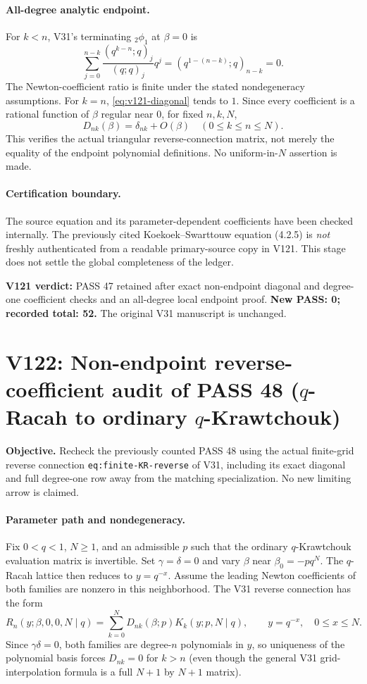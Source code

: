 \documentclass[11pt]{article}
\begin{document}
\paragraph{All-degree analytic endpoint.} For $k<n$, V31's terminating ${}_2\phi_1$ at $\beta=0$ is
\[
 \sum_{j=0}^{n-k}\frac{(q^{k-n};q)_j}{(q;q)_j}q^j
 =(q^{1-(n-k)};q)_{n-k}=0.
\]
The Newton-coefficient ratio is finite under the stated nondegeneracy assumptions. For $k=n$, \eqref{eq:v121-diagonal} tends to $1$. Since every coefficient is a rational function of $\beta$ regular near $0$, for fixed $n,k,N$,
\begin{equation}\label{eq:v121-endpoint}
\boxed{D_{nk}(\beta)=\delta_{nk}+O(\beta)\quad(0\le k\le n\le N).}
\end{equation}
This verifies the actual triangular reverse-connection matrix, not merely the equality of the endpoint polynomial definitions. No uniform-in-$N$ assertion is made.

\paragraph{Certification boundary.} The source equation and its parameter-dependent coefficients have been checked internally. The previously cited Koekoek--Swarttouw equation (4.2.5) is \emph{not} freshly authenticated from a readable primary-source copy in V121. This stage does not settle the global completeness of the ledger.

\noindent\textbf{V121 verdict:} PASS 47 retained after exact non-endpoint diagonal and degree-one coefficient checks and an all-degree local endpoint proof. \textbf{New PASS: 0; recorded total: 52.} The original V31 manuscript is unchanged.



\clearpage
\section{V122: Non-endpoint reverse-coefficient audit of PASS 48 ($q$-Racah to ordinary $q$-Krawtchouk)}
\noindent\textbf{Objective.} Recheck the previously counted PASS 48 using the actual finite-grid reverse connection \texttt{eq:finite-KR-reverse} of V31, including its exact diagonal and full degree-one row away from the matching specialization. No new limiting arrow is claimed.

\paragraph{Parameter path and nondegeneracy.} Fix $0<q<1$, $N\ge1$, and an admissible $p$ such that the ordinary $q$-Krawtchouk evaluation matrix is invertible. Set $\gamma=\delta=0$ and vary $\beta$ near $\beta_0=-pq^N$. The $q$-Racah lattice then reduces to $y=q^{-x}$. Assume the leading Newton coefficients of both families are nonzero in this neighborhood. The V31 reverse connection has the form
\[
 R_n(y;\beta,0,0,N\mid q)=\sum_{k=0}^{N}D_{nk}(\beta;p)K_k(y;p,N\mid q),\qquad y=q^{-x},\quad 0\le x\le N.
\]
Since $\gamma\delta=0$, both families are degree-$n$ polynomials in $y$, so uniqueness of the polynomial basis forces $D_{nk}=0$ for $k>n$ (even though the general V31 grid-interpolation formula is a full $N+1$ by $N+1$ matrix).
\end{document}
